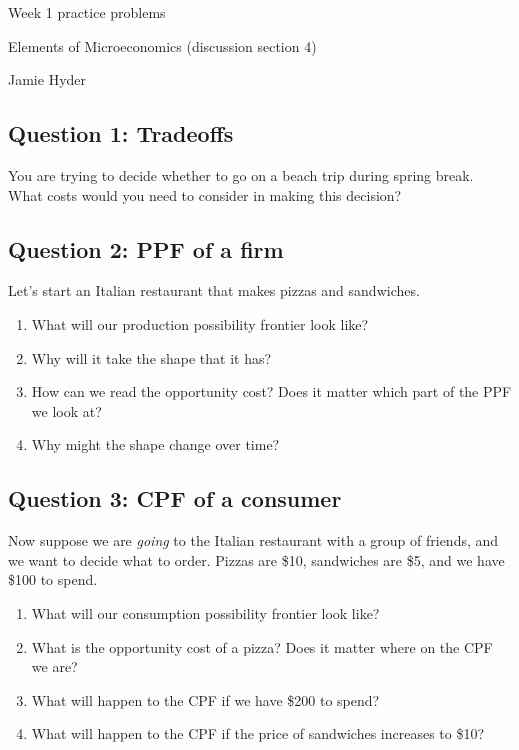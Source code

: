 \documentclass[12pt]{article}
\begin{document}
\begin{center}
\Large Week 1 practice problems

\medskip

\normalsize Elements of Microeconomics (discussion section 4)

\medskip

\small Jamie Hyder
\end{center}

\medskip

\subsection*{Question 1: Tradeoffs}
You are trying to decide whether to go on a beach trip during spring break. What costs would you need to consider in making this decision?

\subsection*{Question 2: PPF of a firm}
Let's start an Italian restaurant that makes pizzas and sandwiches.
\begin{enumerate}
    \item What will our production possibility frontier look like?
    \item Why will it take the shape that it has?
    \item How can we read the opportunity cost? Does it matter which part of the PPF we look at?
    \item Why might the shape change over time?
\end{enumerate}

\subsection*{Question 3: CPF of a consumer}
Now suppose we are \textit{going} to the Italian restaurant with a group of friends, and we want to decide what to order. Pizzas are \$10, sandwiches are \$5, and we have \$100 to spend.
    \begin{enumerate}
        \item What will our consumption possibility frontier look like?
        \item What is the opportunity cost of a pizza? Does it matter where on the CPF we are?
        \item What will happen to the CPF if we have \$200 to spend?
        \item What will happen to the CPF if the price of sandwiches increases to \$10?
    \end{enumerate}
\end{document}
